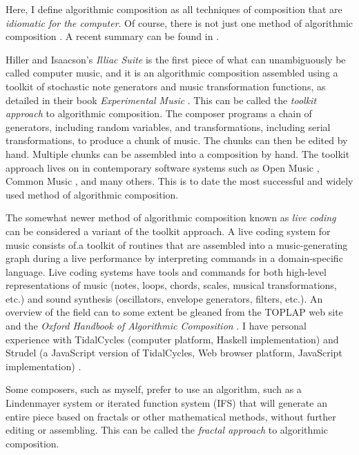 \documentclass[11pt]{scrartcl}
\begin{document}
Here, I define algorithmic composition as all techniques of composition that are \emph{idiomatic for the computer}. Of course, there is not just one method of algorithmic composition \parencite{fernandez2013ai, arizanet}. A recent summary can be found in \parencite{mclean2018oxford}.

Hiller and Isaacson's \emph{Illiac Suite} \parencite{illiacsuite} is the first piece of what can unambiguously be called computer music, and it is an algorithmic composition assembled using a toolkit of stochastic note generators and music transformation functions, as detailed in their book \emph{Experimental Music} \parencite{hiller}. This can be called the \emph{toolkit approach} to algorithmic composition. The composer programs a chain of generators, including random variables, and transformations, including serial transformations, to produce a chunk of music. The chunks can then be edited by hand. Multiple chunks can be assembled into a composition by hand. The toolkit approach lives on in contemporary software systems such as Open Music \parencite{OpenMusic}, Common Music \parencite{CommonMusic, musx}, and many others. This is to date the most successful and widely used method of algorithmic composition.

The somewhat newer method of algorithmic composition known as \emph{live coding} can be considered a variant of the toolkit approach. A live coding system for music consists of.a toolkit of routines that are assembled into a music-generating graph during a live performance by interpreting commands in a domain-specific language. Live coding systems have tools and commands for both high-level representations of music (notes, loops, chords, scales, musical transformations, etc.) and sound synthesis (oscillators, envelope generators, filters, etc.). An overview of the field can to some extent be gleaned from the TOPLAP web site \parencite{toplap} and the \emph{Oxford Handbook of Algorithmic Composition} \parencite{mclean2018oxford}. I have personal experience with TidalCycles (computer platform, Haskell implementation) \parencite{tidalcycles} and Strudel (a JavaScript version of TidalCycles, Web browser platform, JavaScript implementation) \parencite{strudel}.

Some composers, such as myself, prefer to use an algorithm, such as a Lindenmayer system \parencite{algorithmicbeautyofplants, prusinkiewicz1986sgs,  fractalmusicwithstringrewritinggrammars} or iterated function system (IFS) \parencite{fractalseverywhere, ifsmusic} that will generate an entire piece based on fractals or other mathematical methods, without further editing or assembling. This can be called the \emph{fractal approach} to algorithmic composition.
\end{document}
